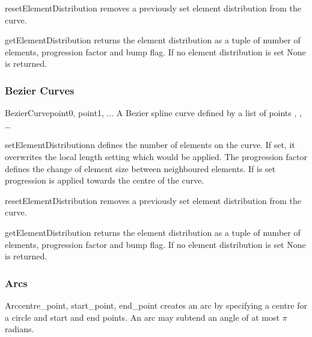\begin{methoddesc}[BSpline]{resetElementDistribution}{}
removes a previously set element distribution from the curve.
\end{methoddesc}

\begin{methoddesc}[BSpline]{getElementDistribution}{}
returns the element distribution as a tuple of number of elements, progression
factor and bump flag. If no element distribution is set None is returned.
\end{methoddesc}

\subsubsection{Bezier Curves}
\begin{classdesc}{BezierCurve}{point0, point1, ...}
A Bezier spline curve defined by a list of points , , \ldots
\end{classdesc}

\begin{methoddesc}[BezierCurve]{setElementDistribution}{n}
defines the number of elements on the curve. If set, it overwrites the local
length setting which would be applied.
The progression factor  defines the change of element size
between neighboured elements. If  is set progression is
applied towards the centre of the curve.
\end{methoddesc}

\begin{methoddesc}[BezierCurve]{resetElementDistribution}{}
removes a previously set element distribution from the curve.
\end{methoddesc}

\begin{methoddesc}[BezierCurve]{getElementDistribution}{}
returns the element distribution as a tuple of number of elements, progression
factor and bump flag. If no element distribution is set None is returned.
\end{methoddesc}

\subsubsection{Arcs}
\begin{classdesc}{Arc}{centre_point, start_point, end_point}
creates an arc by specifying a centre for a circle and start and end points.
An arc may subtend an angle of at most $\pi$ radians.
\end{classdesc}

